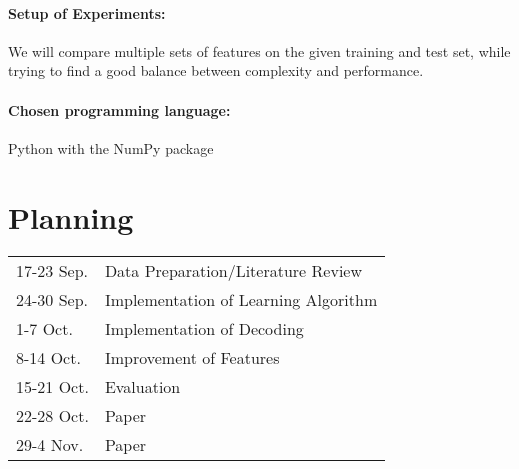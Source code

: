 \documentclass[a4paper,10pt]{article}
\begin{document}
% 
\paragraph{Setup of Experiments:}
We will compare multiple sets of features on the given training and test set, 
while trying to find a good balance between complexity and performance.


\paragraph{Chosen programming language:}
Python with the NumPy package


\section*{Planning}

\begin{table}[h!]
\begin{tabular}{l l}
17-23 Sep. & Data Preparation/Literature Review \\
24-30 Sep. & Implementation of Learning Algorithm\\
1-7 Oct.   & Implementation of Decoding\\
8-14 Oct.  & Improvement of Features\\
15-21 Oct. & Evaluation \\
22-28 Oct. & Paper \\
29-4 Nov.  & Paper\\
\end{tabular}
\end{table}




{\small


}
\end{document}

